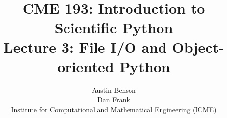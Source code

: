 \documentclass{beamer}
\title{CME 193: Introduction to Scientific Python \\
Lecture 3: File I/O and Object-oriented Python}
\author{Austin Benson \\
\vspace{0.1in}
Dan Frank \\
\vspace{0.1in}
Institute for Computational and Mathematical Engineering (ICME)}
\begin{document}
\maketitle









\begin{frame}

\end{frame}
\end{document}
